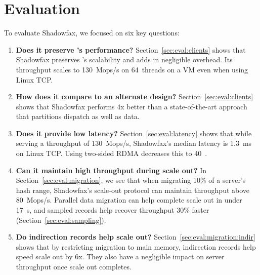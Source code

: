 \section{Evaluation}
\label{sec:eval}

To evaluate Shadowfax, we focused on six key questions:
\begin{enumerate}
\item {\bf Does it preserve \faster{}'s performance?}
  Section~\ref{sec:eval:clients} shows that Shadowfax preserves \faster{}'s
  scalability and adds in negligible overhead.
%
  Its throughput scales to 130~Mops/s on 64~threads on a VM even when using
  Linux TCP.

\item {\bf How does it compare to an alternate design?}
  Section~\ref{sec:eval:clients} shows that Shadowfax performs 4x better than
  a state-of-the-art approach that partitions dispatch as well as data.

\item {\bf Does it provide low latency?}
  Section~\ref{sec:eval:latency} shows that while serving a throughput of 130~Mops/s,
  Shadowfax's median latency is 1.3~ms on Linux TCP.
%
  Using two-sided RDMA decreases this to 40~\us.

\item {\bf Can it maintain high throughput during scale out?}
  In Section~\ref{sec:eval:migration}, we see that when migrating 10\% of a server's
  hash range, Shadowfax's scale-out protocol can maintain throughput
  above 80~Mops/s.
%
  Parallel data migration can help complete scale out in under 17~s,
  and sampled records help recover throughput 30\% faster
  (Section~\ref{sec:eval:sampling}).

%

\item {\bf Do indirection records help scale out?}
  Section~\ref{sec:eval:migration:indir} shows
  that by restricting migration to main memory, indirection records help
  speed scale out by 6x.
%
  They also have a negligible impact on server throughput once scale out
  completes.
%
%


\end{enumerate}
